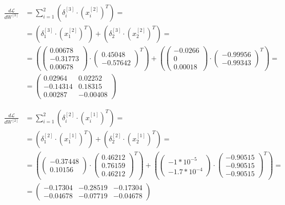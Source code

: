 \documentclass[12pt]{article}
\begin{document}
\begin{enumerate}[leftmargin=\labelsep]
          \begin{align*}
            \frac{d\mathcal{L}}{dW^{[3]}} &= \sum_{i=1}^{2} (\delta^{[3]}_i \cdot (x^{[2]}_i)^{T}) = \\
             &= (\delta^{[3]}_1 \cdot (x^{[2]}_1)^{T}) + (\delta^{[3]}_2 \cdot (x^{[2]}_2)^{T}) = \\
             &= (\begin{pmatrix} 0.00678 \\ -0.31773 \\ 0.00678 \end{pmatrix} \cdot \begin{pmatrix} 0.45048 \\ -0.57642\end{pmatrix}^{T}) + 
                 (\begin{pmatrix} -0.0266 \\ 0 \\ 0.00018 \end{pmatrix} \cdot \begin{pmatrix} -0.99956 \\ -0.99343\end{pmatrix}^{T}) = \\
             &= \begin{pmatrix} 0.02964 & 0.02252 \\ -0.14314 & 0.18315 \\ 0.00287 & -0.00408 \end{pmatrix}
          \end{align*}

          \begin{align*}
            \frac{d\mathcal{L}}{dW^{[2]}} &= \sum_{i=1}^{2} (\delta^{[2]}_i \cdot (x^{[1]}_i)^{T}) = \\
             &= (\delta^{[2]}_1 \cdot (x^{[1]}_1)^{T}) + (\delta^{[2]}_2 \cdot (x^{[1]}_2)^{T}) = \\
             &= (\begin{pmatrix} -0.37448 \\ 0.10156 \end{pmatrix} \cdot \begin{pmatrix} 0.46212 \\ 0.76159 \\ 0.46212\end{pmatrix}^{T}) + 
                 (\begin{pmatrix} -1 * 10^{-5} \\ -1.7 * 10^{-4}  \end{pmatrix} \cdot \begin{pmatrix} -0.90515 \\ -0.90515 \\ -0.90515\end{pmatrix}^{T}) = \\
             &= \begin{pmatrix} -0.17304 & -0.28519 & -0.17304\\ -0.04678 & -0.07719 & -0.04678 \end{pmatrix}
          \end{align*}


\end{enumerate}
\end{document}
